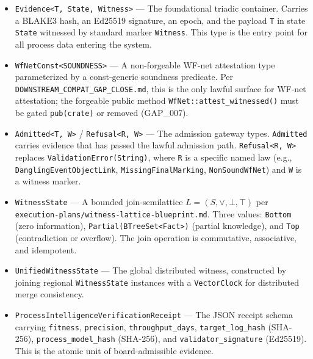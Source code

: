 \begin{itemize}
  \item \texttt{Evidence<T, State, Witness>} --- The foundational triadic container.
    Carries a BLAKE3 hash, an Ed25519 signature, an epoch, and the payload \texttt{T}
    in state \texttt{State} witnessed by standard marker \texttt{Witness}. This type
    is the entry point for all process data entering the system.

  \item \texttt{WfNetConst<SOUNDNESS>} --- A non-forgeable WF-net attestation type
    parameterized by a const-generic soundness predicate. Per
    \texttt{DOWNSTREAM\_COMPAT\_GAP\_CLOSE.md}, this is the only lawful surface for
    WF-net attestation; the forgeable public method \texttt{WfNet::attest\_witnessed()}
    must be gated \texttt{pub(crate)} or removed (GAP\_007).

  \item \texttt{Admitted<T, W>} / \texttt{Refusal<R, W>} --- The admission gateway
    types. \texttt{Admitted} carries evidence that has passed the lawful admission
    path. \texttt{Refusal<R, W>} replaces \texttt{ValidationError(String)}, where
    \texttt{R} is a specific named law (e.g., \texttt{DanglingEventObjectLink},
    \texttt{MissingFinalMarking}, \texttt{NonSoundWfNet}) and \texttt{W} is a witness
    marker.

  \item \texttt{WitnessState} --- A bounded join-semilattice
    $L = (S, \vee, \bot, \top)$ per
    \texttt{execution-plans/witness-lattice-blueprint.md}. Three values:
    \texttt{Bottom} (zero information), \texttt{Partial(BTreeSet<Fact>)} (partial
    knowledge), and \texttt{Top} (contradiction or overflow). The join operation is
    commutative, associative, and idempotent.

  \item \texttt{UnifiedWitnessState} --- The global distributed witness, constructed
    by joining regional \texttt{WitnessState} instances with a \texttt{VectorClock}
    for distributed merge consistency.

  \item \texttt{ProcessIntelligenceVerificationReceipt} --- The JSON receipt schema
    carrying \texttt{fitness}, \texttt{precision}, \texttt{throughput\_days},
    \texttt{target\_log\_hash} (SHA-256), \texttt{process\_model\_hash} (SHA-256),
    and \texttt{validator\_signature} (Ed25519). This is the atomic unit of
    board-admissible evidence.
\end{itemize}

